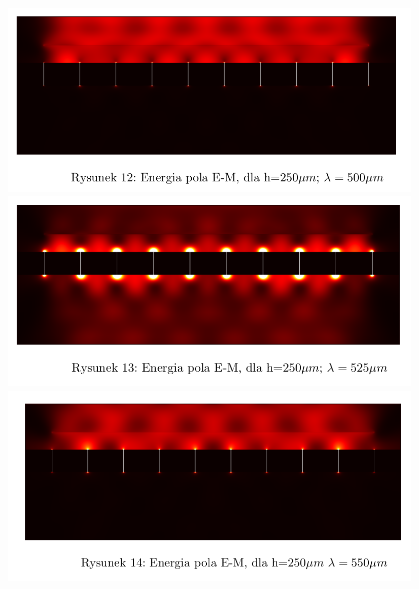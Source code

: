 \documentclass{beamer}
\begin{document}
\begin{frame}
	\begin{columns}
		\begin{column}{0.5\textwidth}
			\begin{figure}
				\includegraphics[width=\textwidth]{../images/antenaThz/con_src_l500.png}\\
				\includegraphics[width=\textwidth]{../images/antenaThz/con_src_l525.png}\\
				\includegraphics[width=\textwidth]{../images/antenaThz/con_src_l550.png}\\
			\end{figure}
		\end{column}
		\begin{column}{0.5\textwidth}

\end{column}
\end{columns}
\end{frame}
\end{document}
